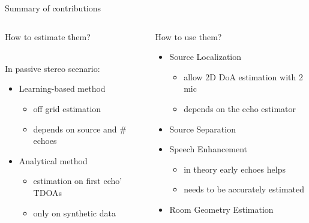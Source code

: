 \begin{frame}[t]{Summary of contributions}

    \begin{columns}[T,onlytextwidth]

        \begin{column}{0.48\textwidth}
            \begin{center}
                \alert{How to estimate them?}
            \end{center}
            \\In passive stereo scenario:
            \begin{itemize}
                \item Learning-based method{\footnotesize
                \begin{itemize}
                    \item off grid estimation
                    \item depends on source and \# echoes
                \end{itemize}}
                \item Analytical method{\footnotesize
                \begin{itemize}
                    \item estimation on first echo' TDOAs
                    \item only on synthetic data
                \end{itemize}}
            \end{itemize}
        \end{column}

        \begin{column}{0.48\textwidth}
            \begin{center}
                \alert{How to use them?}
            \end{center}
            \begin{itemize}
                \item Source Localization{\footnotesize
                \begin{itemize}
                    \item allow 2D DoA estimation with 2 mic
                    \item depends on the echo estimator
                \end{itemize}}
                \item Source Separation
                \item Speech Enhancement{\footnotesize
                \begin{itemize}
                    \item in theory early echoes helps
                    \item needs to be accurately estimated
                \end{itemize}}
                \item Room Geometry Estimation
            \end{itemize}
        \end{column}
    \end{columns}



\end{frame}
